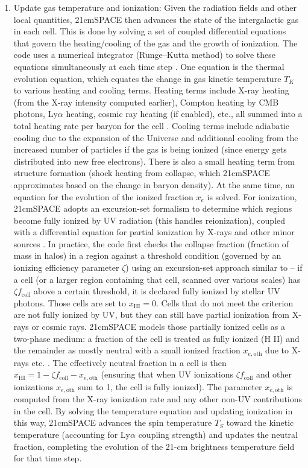 \documentclass[floats,floatfix,showpacs,amssymb,prd,superscriptaddress,nofootinbib]{revtex4-2} %
\begin{document}
\begin{enumerate}
    \item Update gas temperature and ionization: Given the radiation fields and other local quantities, 21cmSPACE then advances the state of the intergalactic gas in each cell. This is done by solving a set of coupled differential equations that govern the heating/cooling of the gas and the growth of ionization. The code uses a numerical integrator (Runge–Kutta method) to solve these equations simultaneously at each time step \citep{gessey-jones_2024}. One equation is the thermal evolution equation, which equates the change in gas kinetic temperature $T_K$ to various heating and cooling terms. Heating terms include X-ray heating (from the X-ray intensity computed earlier), Compton heating by CMB photons, Ly$\alpha$ heating, cosmic ray heating (if enabled), etc., all summed into a total heating rate per baryon for the cell \citep{gessey-jones_2024}. Cooling terms include adiabatic cooling due to the expansion of the Universe and additional cooling from the increased number of particles if the gas is being ionized (since energy gets distributed into new free electrons). There is also a small heating term from structure formation (shock heating from collapse, which 21cmSPACE approximates based on the change in baryon density). At the same time, an equation for the evolution of the ionized fraction $x_e$ is solved. For ionization, 21cmSPACE adopts an excursion-set formalism to determine which regions become fully ionized by UV radiation (this handles reionization), coupled with a differential equation for partial ionization by X-rays and other minor sources \citep{gessey-jones_2024}. In practice, the code first checks the collapse fraction (fraction of mass in halos) in a region against a threshold condition (governed by an ionizing efficiency parameter $\zeta$) using an excursion-set approach similar to \citet{Mesinger_2010} – if a cell (or a larger region containing that cell, scanned over various scales) has $\zeta f_{\text{coll}}$ above a certain threshold, it is declared fully ionized by stellar UV photons. Those cells are set to $x_{\mathrm{HI}} = 0$. Cells that do not meet the criterion are not fully ionized by UV, but they can still have partial ionization from X-rays or cosmic rays. 21cmSPACE models those partially ionized cells as a two-phase medium: a fraction of the cell is treated as fully ionized (H II) and the remainder as mostly neutral with a small ionized fraction $x_{e,\text{oth}}$ due to X-rays etc. \citep{gessey-jones_2024}. The effectively neutral fraction in a cell is then $x_{\mathrm{HI}} = 1 - \zeta f_{\text{coll}} - x_{e,\text{oth}}$ (ensuring that when UV ionizations $\zeta f_{\text{coll}}$ and other ionizations $x_{e,\text{oth}}$ sum to 1, the cell is fully ionized). The parameter $x_{e,\text{oth}}$ is computed from the X-ray ionization rate and any other non-UV contributions in the cell. By solving the temperature equation and updating ionization in this way, 21cmSPACE advances the spin temperature $T_S$ toward the kinetic temperature (accounting for Ly$\alpha$ coupling strength) and updates the neutral fraction, completing the evolution of the 21-cm brightness temperature field for that time step.


\end{enumerate}
\end{document}
